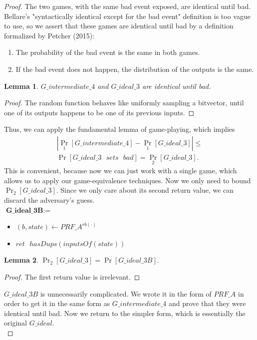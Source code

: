 \documentclass[12pt,lot, lof]{puthesis}
\newenvironment{game}
{ \begin{itemize}[noitemsep,nolistsep] 
}
{ \end{itemize}                  }
\newcommand{\s} {\textrm{ }}
\newtheorem{lem}{Lemma}[thm]
\begin{document}
\begin{proof}
The two games, with the same bad event exposed, are identical until bad. Bellare's "syntactically identical except for the bad event" definition is too vague to use, so we assert that these games are identical until bad by a definition formalized by Petcher (2015):

\begin{enumerate}
\item The probability of the bad event is the same in both games. 
\item If the bad event does not happen, the distribution of the outputs is the same. 
\end{enumerate}

\begin{lem}$G\_intermediate\_4$ and $G\_ideal\_3$ are identical until bad.\end{lem}
\begin{proof} The random function behaves like uniformly sampling a bitvector, until one of its outputs happens to be one of its previous inputs. \end{proof}

Thus, we can apply the fundamental lemma of game-playing, which implies
\begin{gather*}
|\Pr_1[G\_intermediate\_4] - \Pr_1[G\_ideal\_3]| \leq \\ 
\Pr[G\_ideal\_3 \s sets \s bad] = \Pr_2[G\_ideal\_3].
\end{gather*}
This is convenient, because now we can just work with a single game, which allows us to apply our game-equivalence techniques. Now we only need to bound $\Pr_2[G\_ideal\_3]$. Since we only care about its second return value, we can discard the adversary's guess.\\

$\textbf{G\_ideal\_3B} := $
\begin{game}
\item[] $(b, state) \leftarrow PRF\_A^{rb(\cdot)}$ 
\item[] $ret \s hasDups(inputsOf(state))$ 
\end{game}

\begin{lem}$\Pr_2[G\_ideal\_3] = \Pr[G\_ideal\_3B].$\end{lem}
\begin{proof}The first return value is irrelevant.\end{proof}

$G\_ideal\_3B$ is unnecessarily complicated. We wrote it in the form of $PRF\_A$ in order to get it in the same form as $G\_intermediate\_4$ and prove that they were identical until bad. Now we return to the simpler form, which is essentially the original $G\_ideal$.\\


\end{proof}
\end{document}
